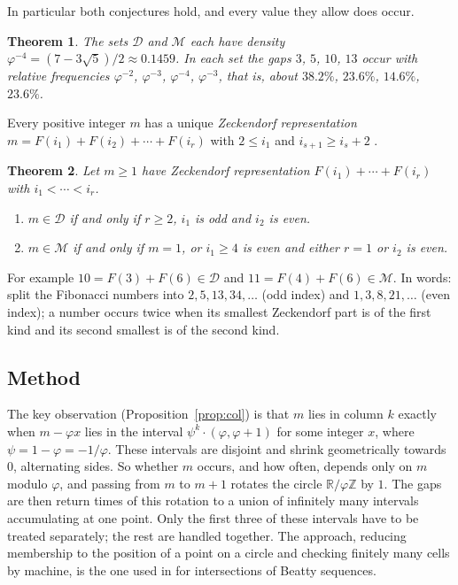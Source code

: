 \documentclass[12pt]{article}
\newcommand{\Z}{\mathbb{Z}}
\newcommand{\R}{\mathbb{R}}
\newcommand{\D}{\mathcal{D}}
\newcommand{\M}{\mathcal{M}}
\theoremstyle{plain}
\newtheorem{theorem}{Theorem}
\theoremstyle{remark}
\begin{document}
In particular both conjectures hold, and every value they allow does occur.

\begin{theorem}\label{thm:freq}
The sets $\D$ and $\M$ each have density $\varphi^{-4}=(7-3\sqrt5)/2\approx0.1459$. In each set
the gaps $3$, $5$, $10$, $13$ occur with relative frequencies $\varphi^{-2}$, $\varphi^{-3}$,
$\varphi^{-4}$, $\varphi^{-3}$, that is, about $38.2\%$, $23.6\%$, $14.6\%$, $23.6\%$.
\end{theorem}

Every positive integer $m$ has a unique \emph{Zeckendorf representation}
$m=F(i_1)+F(i_2)+\cdots+F(i_r)$ with $2\le i_1$ and $i_{s+1}\ge i_s+2$ \cite{zeckendorf}.

\begin{theorem}\label{thm:zeck}
Let $m\ge1$ have Zeckendorf representation $F(i_1)+\cdots+F(i_r)$ with $i_1<\cdots<i_r$.
\begin{enumerate}
\item[(a)] $m\in\D$ if and only if $r\ge2$, $i_1$ is odd and $i_2$ is even.
\item[(b)] $m\in\M$ if and only if $m=1$, or $i_1\ge4$ is even and either $r=1$ or $i_2$ is even.
\end{enumerate}
\end{theorem}

For example $10=F(3)+F(6)\in\D$ and $11=F(4)+F(6)\in\M$. In words: split the Fibonacci numbers
into $2,5,13,34,\dots$ (odd index) and $1,3,8,21,\dots$ (even index); a number occurs twice when
its smallest Zeckendorf part is of the first kind and its second smallest is of the second kind.

\subsection*{Method}

The key observation (Proposition~\ref{prop:col}) is that $m$ lies in column $k$ exactly when
$m-\varphi x$ lies in the interval $\psi^k\cdot(\varphi,\varphi+1)$ for some integer $x$, where
$\psi=1-\varphi=-1/\varphi$. These intervals are disjoint and shrink geometrically towards $0$,
alternating sides. So whether $m$ occurs, and how often, depends only on $m$ modulo $\varphi$,
and passing from $m$ to $m+1$ rotates the circle $\R/\varphi\Z$ by $1$. The gaps are then
return times of this rotation to a union of infinitely many intervals accumulating at one point.
Only the first three of these intervals have to be treated separately; the rest are handled
together. The approach, reducing membership to the position of a point on a circle and checking
finitely many cells by machine, is the one used in \cite{link} for intersections of Beatty
sequences.
\end{document}
